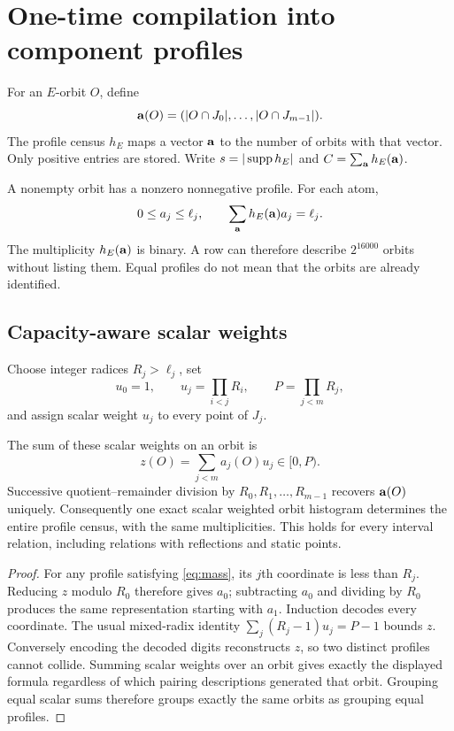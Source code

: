 \section{One-time compilation into component profiles}
\label{sec:profiles}

\begin{definition}
For an $E$-orbit $O$, define
\[
 \mathbf a(O)=(|O\cap J_0|,\ldots,|O\cap J_{m-1}|).
\]
The profile census $h_E$ maps a vector $\mathbf a$ to the number of orbits
with that vector. Only positive entries are stored. Write $s=|\operatorname{supp} h_E|$
and $C=\sum_{\mathbf a}h_E(\mathbf a)$.
\end{definition}

A nonempty orbit has a nonzero nonnegative profile. For each atom,
\begin{equation}
 0\le a_j\le\ell_j,
 \qquad
 \sum_{\mathbf a}h_E(\mathbf a)a_j=\ell_j.
 \label{eq:mass}
\end{equation}
The multiplicity $h_E(\mathbf a)$ is binary. A row can therefore describe
$2^{16000}$ orbits without listing them. Equal profiles do not mean that the
orbits are already identified.

\subsection{Capacity-aware scalar weights}

Choose integer radices $R_j>\ell_j$, set
\[
 u_0=1,\qquad u_j=\prod_{i<j}R_i,
 \qquad P=\prod_{j<m}R_j,
\]
and assign scalar weight $u_j$ to every point of $J_j$.

\begin{theorem}
\label{thm:packing}
The sum of these scalar weights on an orbit is
\[
 z(O)=\sum_{j<m}a_j(O)u_j\in[0,P).
\]
Successive quotient--remainder division by $R_0,R_1,\ldots,R_{m-1}$ recovers
$\mathbf a(O)$ uniquely. Consequently one exact scalar weighted orbit
histogram determines the entire profile census, with the same
multiplicities. This holds for every interval relation, including relations
with reflections and static points.
\end{theorem}

\begin{proof}
For any profile satisfying \eqref{eq:mass}, its $j$th coordinate is less than
$R_j$. Reducing $z$ modulo $R_0$ therefore gives $a_0$; subtracting $a_0$ and
dividing by $R_0$ produces the same representation starting with $a_1$.
Induction decodes every coordinate. The usual mixed-radix identity
$\sum_j(R_j-1)u_j=P-1$ bounds $z$. Conversely encoding the decoded digits
reconstructs $z$, so two distinct profiles cannot collide. Summing scalar
weights over an orbit gives exactly the displayed formula regardless of
which pairing descriptions generated that orbit. Grouping equal scalar sums
therefore groups exactly the same orbits as grouping equal profiles.
\end{proof}

